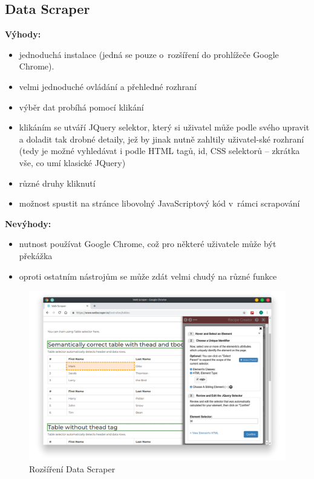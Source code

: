 \documentclass[thesis=B,czech]{FITthesis}[2012/06/26]
\begin{document}
\subsection{Data Scraper}
\textbf{Výhody:}
\begin{itemize}
	\item jednoduchá instalace (jedná se pouze o~rozšíření do prohlížeče Google Chrome).
	\item velmi jednoduché ovládání a přehledné rozhraní
	\item výběr dat probíhá pomocí klikání
	\item klikáním se utváří JQuery selektor, který si uživatel může podle svého upravit a doladit tak drobné detaily, jež by jinak nutně zahltily uživatel-ské rozhraní (tedy je možné vyhledávat i podle HTML tagů, id, CSS selektorů -- zkrátka vše, co umí klasické JQuery)
	\item různé druhy kliknutí
	\item možnost spustit na stránce libovolný JavaScriptový kód v~rámci scrapování
\end{itemize}
\textbf{Nevýhody:}
\begin{itemize}
	\item nutnost používat Google Chrome, což pro některé uživatele může být překážka
	\item oproti ostatním nástrojům se může zdát velmi chudý na různé funkce
\end{itemize}
\begin{figure}
	\includegraphics[width=\linewidth]{images/DataScraper.png}
	\caption{Rozšíření Data Scraper\cite[snímek pořídil autor]{data_scraper}}
	\label{fig:dataScraper}
\end{figure}
\end{document}
